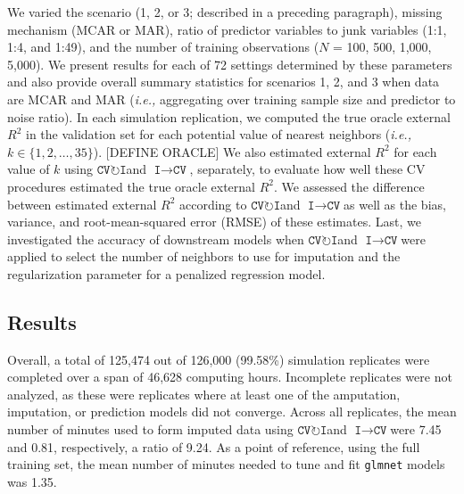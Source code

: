 \documentclass[AMA,STIX1COL,doublespace]{WileyNJD-v2}
\begin{document}
We varied the scenario (1, 2, or 3; described in a preceding paragraph),
missing mechanism (MCAR or MAR), ratio of predictor variables to junk
variables (1:1, 1:4, and 1:49), and the number of training observations
(\(N\) = 100, 500, 1,000, 5,000). We present results for each of 72
settings determined by these parameters and also provide overall summary
statistics for scenarios 1, 2, and 3 when data are MCAR and MAR
(\textit{i.e., }aggregating over training sample size and predictor to
noise ratio). In each simulation replication, we computed the true
oracle external \(R^2\) in the validation set for each potential value
of nearest neighbors
(\textit{i.e., }\(k \in \lbrace 1, 2, \ldots, 35 \rbrace\)). {[}DEFINE
ORACLE{]} We also estimated external \(R^2\) for each value of \(k\)
using $\texttt{CV}\!\circlearrowright\!\texttt{I}$\space and
$\texttt{I}\!\!\rightarrow\!\texttt{CV}$, separately, to evaluate how
well these CV procedures estimated the true oracle external \(R^2\). We
assessed the difference between estimated external \(R^2\) according to
$\texttt{CV}\!\circlearrowright\!\texttt{I}$\space and
$\texttt{I}\!\!\rightarrow\!\texttt{CV}$\space as well as the bias,
variance, and root-mean-squared error (RMSE) of these estimates. Last,
we investigated the accuracy of downstream models when
$\texttt{CV}\!\circlearrowright\!\texttt{I}$\space and
$\texttt{I}\!\!\rightarrow\!\texttt{CV}$\space were applied to select
the number of neighbors to use for imputation and the regularization
parameter for a penalized regression model.

\subsection{Results} \label{subsec:sim_results}

Overall, a total of 125,474 out of 126,000 (99.58\%) simulation
replicates were completed over a span of 46,628 computing hours.
Incomplete replicates were not analyzed, as these were replicates where
at least one of the amputation, imputation, or prediction models did not
converge. Across all replicates, the mean number of minutes used to form
imputed data using
$\texttt{CV}\!\circlearrowright\!\texttt{I}$\space and
$\texttt{I}\!\!\rightarrow\!\texttt{CV}$\space were 7.45 and 0.81,
respectively, a ratio of 9.24. As a point of reference, using the full
training set, the mean number of minutes needed to tune and fit
\texttt{glmnet} models was 1.35.
\end{document}

